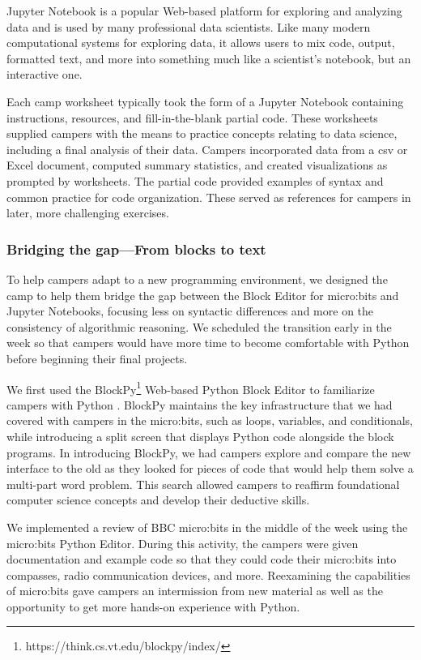 Jupyter Notebook is a popular Web-based platform for exploring and
analyzing data and is used by many professional data scientists.  Like
many modern computational systems for exploring data, it allows 
users to mix code, output, formatted text, and more into something
much like a scientist's notebook, but an interactive one.

Each camp worksheet typically took the form of a Jupyter Notebook
containing instructions, resources, and fill-in-the-blank partial
code.  These worksheets supplied campers with the means to practice
concepts relating to data science, including a final analysis of
their data.  Campers incorporated data from a csv or Excel document,
computed summary statistics, and created visualizations as prompted
by worksheets. The partial code provided examples
of syntax and common practice for code organization.  These served
as references for campers in later, more challenging exercises.

\subsubsection{Bridging the gap---From blocks to text}

To help campers adapt to a new programming environment, we designed
the camp to help them bridge the gap between the Block
Editor for micro:bits and Jupyter Notebooks, focusing less on
syntactic differences and more on the consistency of algorithmic
reasoning.  We scheduled the transition early in the week so that
campers would have more time to become comfortable with Python
before beginning their final projects.

We first used the BlockPy\footnote{https://think.cs.vt.edu/blockpy/index/}
Web-based Python Block Editor to familiarize campers with Python
\cite{Bart2017}.  BlockPy maintains the key infrastructure that we
had covered with campers in the micro:bits, such as loops, variables,
and conditionals, while introducing a split screen that displays
Python code alongside the block programs. In introducing BlockPy,
we had campers explore and compare the new interface to the old as
they looked for pieces of code that would help them solve a multi-part
word problem. This search allowed campers to reaffirm foundational
computer science concepts and develop their deductive skills.

We implemented a review of BBC micro:bits in the middle
of the week using the micro:bits Python Editor. During this activity,
the campers were given documentation and example code so that they
could code their micro:bits into compasses, radio communication
devices, and more. Reexamining the capabilities of micro:bits gave
campers an intermission from new material as well as the opportunity
to get more hands-on experience with Python.

